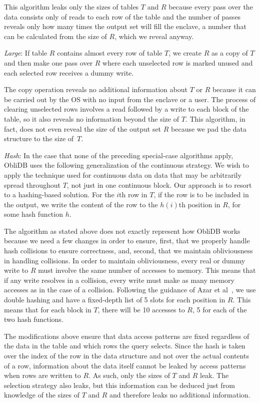 \documentclass[letterpaper,twocolumn,10pt]{article}
\def\name/{ObliDB}
\begin{document}
This algorithm leaks only the sizes of tables $T$ and $R$ because every pass over the data consists only of reads to each row of the table and the number of passes reveals only how many times the output set will fill the enclave, a number that can be calculated from the size of $R$, which we reveal anyway.

\textit{Large}: If table $R$ contains almost every row of table $T$, we create $R$ as a copy of $T$ and then make one pass over $R$ where each unselected row is marked unused and each selected row receives a dummy write.

The copy operation reveals no additional information about $T$ or $R$ because it can be carried out by the OS with no input from the enclave or a user. The process of clearing unselected rows involves a read followed by a write to each block of the table, so it also reveals no information beyond the size of $T$. This algorithm, in fact, does not even reveal the size of the output set $R$ because we pad the data structure to the size of~$T$.

\textit{Hash}: In the case that none of the preceding special-case algorithms apply, \name/ uses the following generalization of the continuous strategy. We wish to apply the technique used for continuous data on data that may be arbitrarily spread throughout $T$, not just in one continuous block. Our approach is to resort to a hashing-based solution. For the $i$th row in $T$, if the row is to be included in the output, we write the content of the row to the $h(i)$th position in $R$, for some hash function $h$.

The algorithm as stated above does not exactly represent how \name/ works because we need a few changes in order to ensure, first, that we properly handle hash collisions to ensure correctness, and, second, that we maintain obliviousness in handling collisions. In order to maintain obliviousness, every real or dummy write to $R$ must involve the same number of accesses to memory. This means that if any write resolves in a collision, every write must make as many memory accesses as in the case of a collision. Following the guidance of Azar et al~\cite{ABKU99}, we use double hashing and have a fixed-depth list of 5 slots for each position in $R$. This means that for each block in $T$, there will be 10 accesses to $R$, 5 for each of the two hash functions.

The modifications above ensure that data access patterns are fixed regardless of the data in the table and which rows the query selects. Since the hash is taken over the index of the row in the data structure and not over the actual contents of a row, information about the data itself cannot be leaked by access patterns when rows are written to $R$. As such, only the sizes of $T$ and $R$ leak. The selection strategy also leaks, but this information can be deduced just from knowledge of the sizes of $T$ and $R$ and therefore leaks no additional information.
\end{document}
